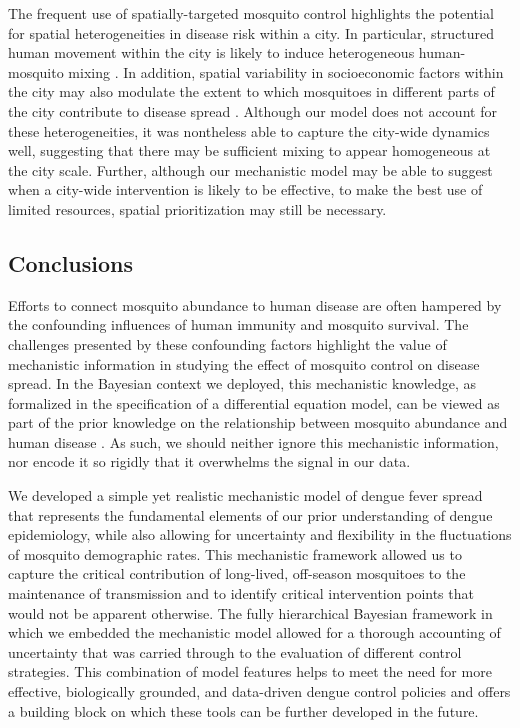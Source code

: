 \documentclass[10pt,letterpaper]{article}
\begin{document}
The frequent use of spatially-targeted mosquito control highlights the potential for spatial heterogeneities in disease risk within a city.
In particular, structured human movement within the city is likely to induce heterogeneous human-mosquito mixing \cite{Adams2009, Cosner2009a, Stoddard2009}.
In addition, spatial variability in socioeconomic factors within the city may also modulate the extent to which mosquitoes in different parts of the city contribute to disease spread \cite{Mondini2008, Honorio2009, Hu2012, DeMattosAlmeida2007}.
Although our model does not account for these heterogeneities, it was nontheless able to capture the city-wide dynamics well, suggesting that there may be sufficient mixing to appear homogeneous at the city scale.
Further, although our mechanistic model may be able to suggest when a city-wide intervention is likely to be effective, to make the best use of limited resources, spatial prioritization may still be necessary.

\subsection*{Conclusions}

Efforts to connect mosquito abundance to human disease are often hampered by the confounding influences of human immunity and mosquito survival.
The challenges presented by these confounding factors highlight the value of mechanistic information in studying the effect of mosquito control on disease spread.
In the Bayesian context we deployed, this mechanistic knowledge, as formalized in the specification of a differential equation model, can be viewed as part of the prior knowledge on the relationship between mosquito abundance and human disease \cite{Ellner1998, Wikle2010}.
As such, we should neither ignore this mechanistic information, nor encode it so rigidly that it overwhelms the signal in our data.

We developed a simple yet realistic mechanistic model of dengue fever spread that represents the fundamental elements of our prior understanding of dengue epidemiology, while also allowing for uncertainty and flexibility in the fluctuations of mosquito demographic rates.
This mechanistic framework allowed us to capture the critical contribution of long-lived, off-season mosquitoes to the maintenance of transmission and to identify critical intervention points that would not be apparent otherwise.
The fully hierarchical Bayesian framework in which we embedded the mechanistic model allowed for a thorough accounting of uncertainty that was carried through to the evaluation of different control strategies.
This combination of model features helps to meet the need for more effective, biologically grounded, and data-driven dengue control policies and offers a building block on which these tools can be further developed in the future.
\end{document}
